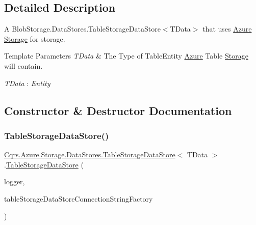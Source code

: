 \subsection{Detailed Description}
A Blob\+Storage.\+Data\+Stores.\+Table\+Storage\+Data\+Store$<$\+T\+Data$>$ that uses \hyperlink{namespaceCqrs_1_1Azure}{Azure} \hyperlink{namespaceCqrs_1_1Azure_1_1Storage}{Storage} for storage. 


\begin{DoxyTemplParams}{Template Parameters}
{\em T\+Data} & The Type of Table\+Entity \hyperlink{namespaceCqrs_1_1Azure}{Azure} Table \hyperlink{namespaceCqrs_1_1Azure_1_1Storage}{Storage} will contain.\\
\hline
\end{DoxyTemplParams}
\begin{Desc}
\item[Type Constraints]\begin{description}
\item[{\em T\+Data} : {\em Entity}]\end{description}
\end{Desc}


\subsection{Constructor \& Destructor Documentation}
\mbox{\label{classCqrs_1_1Azure_1_1Storage_1_1DataStores_1_1TableStorageDataStore_a25a32a83c14eb5068f5bc9bcacfa15f6_a25a32a83c14eb5068f5bc9bcacfa15f6}} 
\subsubsection{\texorpdfstring{Table\+Storage\+Data\+Store()}{TableStorageDataStore()}}
{\footnotesize\ttfamily \hyperlink{classCqrs_1_1Azure_1_1Storage_1_1DataStores_1_1TableStorageDataStore}{Cqrs.\+Azure.\+Storage.\+Data\+Stores.\+Table\+Storage\+Data\+Store}$<$ T\+Data $>$.\hyperlink{classCqrs_1_1Azure_1_1Storage_1_1DataStores_1_1TableStorageDataStore}{Table\+Storage\+Data\+Store} (\begin{DoxyParamCaption}\item[{I\+Logger}]{logger,  }\item[{\hyperlink{interfaceCqrs_1_1Azure_1_1BlobStorage_1_1DataStores_1_1ITableStorageDataStoreConnectionStringFactory}{I\+Table\+Storage\+Data\+Store\+Connection\+String\+Factory}}]{table\+Storage\+Data\+Store\+Connection\+String\+Factory }\end{DoxyParamCaption})}



